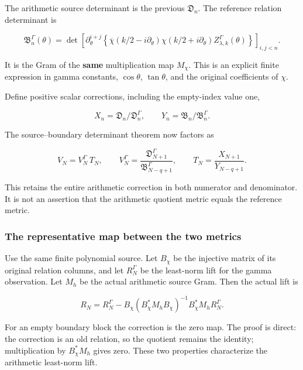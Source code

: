 The arithmetic source determinant is the previous \(\mathfrak D_n\). The
reference relation determinant is

\[
\mathfrak B_n^\Gamma(\theta)
=\det\left[\partial_\theta^{i+j}
 \left\{\overline\chi(k/2-i\partial_\theta)
       \chi(k/2+i\partial_\theta)
       Z_{\lambda,k}^\Gamma(\theta)\right\}\right]_{i,j<n}.         \tag{GD.30}
\]

It is the Gram of the \textbf{same} multiplication map \(M_\chi\). This
is an explicit finite expression in gamma constants, \(\cos\theta\),
\(\tan\theta\), and the original coefficients of \(\chi\).

Define positive scalar corrections, including the empty-index value one,

\[
X_n=\mathfrak D_n/\mathfrak D_n^\Gamma,\qquad
Y_n=\mathfrak B_n/\mathfrak B_n^\Gamma.
\]

The source--boundary determinant theorem now factors as

\[
\boxed{
V_N=V_N^\Gamma\,T_N,\qquad
 V_N^\Gamma=\frac{\mathfrak D_{N+1}^\Gamma}{\mathfrak B_{N-q+1}^\Gamma},\qquad
 T_N=\frac{X_{N+1}}{Y_{N-q+1}}.
}                                                                   \tag{GD.31}
\]

This retains the entire arithmetic correction in both numerator and
denominator. It is not an assertion that the arithmetic quotient metric
equals the reference metric.

\subsubsection{The representative map between the two
metrics}\label{gammad-the-representative-map-between-the-two-metrics}

Use the same finite polynomial source. Let \(B_\chi\) be the injective
matrix of its original relation columns, and let \(R_N^\Gamma\) be the
least-norm lift for the gamma observation. Let \(M_h\) be the actual
arithmetic source Gram. Then the actual lift is

\[
\boxed{
R_N=R_N^\Gamma-
B_\chi(B_\chi^*M_hB_\chi)^{-1}B_\chi^*M_hR_N^\Gamma.
}                                                                   \tag{GD.32}
\]

For an empty boundary block the correction is the zero map. The proof is
direct: the correction is an old relation, so the quotient remains the
identity; multiplication by \(B_\chi^*M_h\) gives zero. These two
properties characterize the arithmetic least-norm lift.

